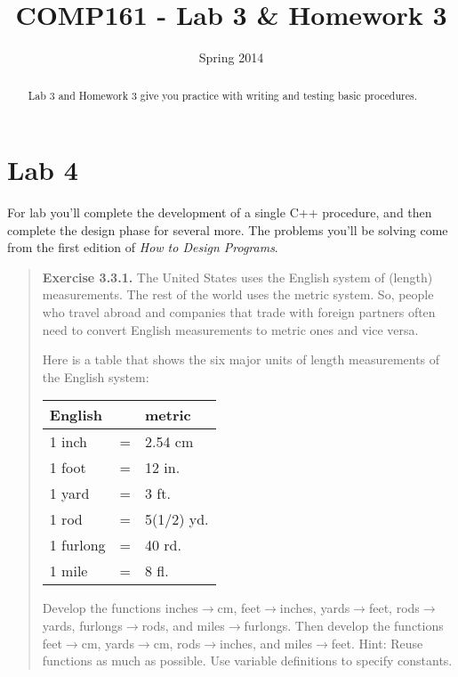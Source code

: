 \documentclass[]{tufte-handout}
\title{COMP161 - Lab 3 \& Homework 3}
\author{}
\date{Spring 2014}
\begin{document}
\maketitle

\begin{abstract}
Lab 3 and Homework 3 give you practice with writing and testing basic procedures.  
\end{abstract}

\section{Lab 4}

For lab you'll complete the development of a single C++ procedure, and then complete the design phase for several more. The problems you'll be solving come from the first edition of \textit{How to Design Programs}.
\begin{framed}
\begin{quote}
\textbf{Exercise 3.3.1.}   The United States uses the English system of (length) measurements. The rest of the world uses the metric system. So, people who travel abroad and companies that trade with foreign partners often need to convert English measurements to metric ones and vice versa.

Here is a table that shows the six major units of length measurements of the English system:


\begin{center}
\begin{tabular}{lcl}
English & &  metric \\ \hline
1 inch	&=&	2.54	cm \\
1 foot	&=&	12	in. \\
1 yard	&=&	3	ft. \\
1 rod	&=&	5(1/2)	yd.\\
1 furlong	&=&	40	rd.\\
1 mile	&=&	8	fl.
\end{tabular}
\end{center}

Develop the functions inches$\rightarrow$cm, feet$\rightarrow$inches, yards$\rightarrow$feet, rods$\rightarrow$yards, furlongs$\rightarrow$rods, and miles$\rightarrow$furlongs.
Then develop the functions feet$\rightarrow$cm, yards$\rightarrow$cm, rods$\rightarrow$inches, and miles$\rightarrow$feet.
Hint: Reuse functions as much as possible. Use variable definitions to specify constants.
\end{quote}
\end{framed}
\end{document}
